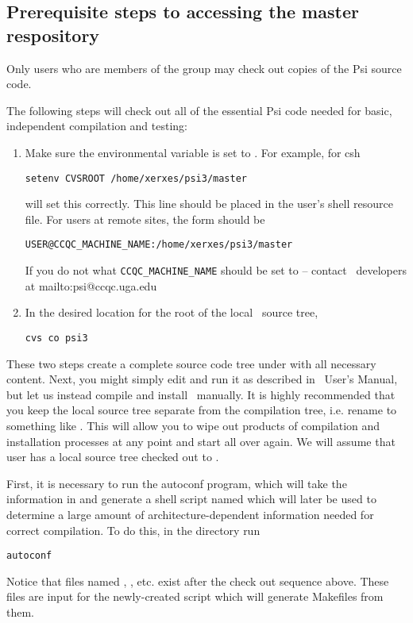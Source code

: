 \subsection{Prerequisite steps to accessing the master respository}
Only users who are members of the  group may check out copies of the
Psi source code.

The following steps will check out all of the essential Psi code needed for basic,
independent compilation and testing:
\begin{enumerate}
\item Make sure the environmental variable  is set to
. For example, for csh
\begin{verbatim}
setenv CVSROOT /home/xerxes/psi3/master
\end{verbatim}
will set this correctly. This line should be placed in the user's shell
resource file. For users at remote sites, the form should be 
\begin{verbatim}
USER@CCQC_MACHINE_NAME:/home/xerxes/psi3/master 
\end{verbatim}
If you do not what {\tt CCQC\_MACHINE\_NAME} should be set to --
contact \PSIthree\ developers at 
{mailto:psi@ccqc.uga.edu}
\item In the desired location for the root of the local
\PSIthree\ source tree,
\begin{verbatim}
cvs co psi3
\end{verbatim}
\end{enumerate}
These two steps create a complete source code tree under 
with all necessary content. Next, you might simply edit  and
run it as described in \PSIthree\ User's Manual, but let us instead compile
and install \PSIthree\ manually. It is highly recommended that you keep
the local source tree separate from the compilation tree, i.e. rename 
 to something like . This will allow you to
wipe out products of compilation and installation processes at any point
and start all over again. We will assume that user has a local
source tree checked out to .

First, it is necessary to run the autoconf program, which will take the
information in  and generate a shell
script named  which will later be used to determine
a large amount of architecture-dependent information needed for correct
compilation. To do this, in the directory  run
\begin{verbatim}
autoconf 
\end{verbatim}
Notice that files named , , etc.
exist after the check out sequence above. These files are input for
the newly-created  script which will generate Makefiles from them.

